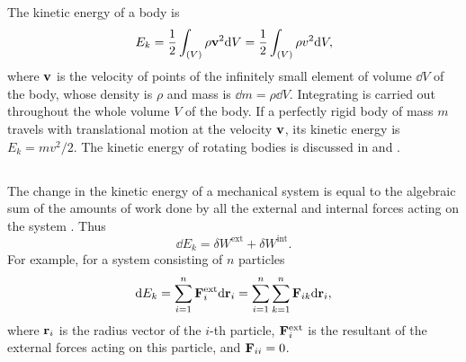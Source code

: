 The kinetic energy of a body is
\begin{equation*}%
E_{k} = \frac{1}{2} \int_{(V)} \rho \vb{v}^{2} \dd V = \frac{1}{2} \int_{(V)} \rho {v}^{2} \dd V ,
\end{equation*}
where $\vb{v}$ is the velocity of points of the infinitely small element of volume $\dd V$ of the body, whose density is $\rho$ and mass is $\dd m = \rho \dd V$. Integrating is carried out throughout the whole volume $V$ of the body. If a perfectly rigid body of mass $m$ travels with translational motion at the velocity $\vb{v}$, its kinetic energy is $E_{k} = mv^{2}/2$. The kinetic energy of rotating bodies is discussed in  and .

\subsection{}\label{3.2.3} The change in the kinetic energy of a mechanical system is equal to the algebraic sum of the amounts of work done by all the external and internal forces acting on the system . Thus
\begin{equation*}%
\dd E_{k} = \delta W^{\textrm{ext}} + \delta W^{\textrm{int}}.
\end{equation*}
For example, for a system consisting of $n$ particles
\begin{equation*}%
\dd E_{k} = \sum_{i=1}^{n}\vb{F}^{\textrm{ext}}_{i} \dd \vb{r}_{i} = \sum_{i=1}^{n}\sum_{k=1}^{n}\vb{F}_{ik} \dd \vb{r}_{i},
\end{equation*}
where $\vb{r}_{i}$ is the radius vector of the $i$-th particle, $\vb{F}^{\textrm{ext}}_{i}$ is the re­sultant of the external forces acting on this particle, and $\vb{F}_{ii}=0$.


